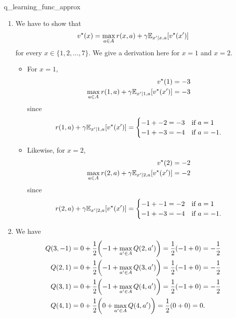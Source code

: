 \section*{}

\begin{solution}{q_learning_func_approx}
  \begin{enumerate}[beginpenalty=10000]
    \item We have to show that \begin{align*}
      \v*{x} = \max_{a \in \sA} r(x, a) + \gamma \E[x' \mid x, a]{\v*{x'}}
    \end{align*} for every $x \in \{1, 2, \dots, 7\}$.
    We give a derivation here for $x = 1$ and $x = 2$.
    \begin{itemize}
      \item For $x = 1$, \begin{align*}
        \v*{1} &= -3 \\
        \max_{a \in \sA} r(1, a) + \gamma \E[x' \mid 1, a]{\v*{x'}} &= -3
      \end{align*} since \begin{align*}
        r(1, a) + \gamma \E[x' \mid 1, a]{\v*{x'}} = \begin{cases}
          -1 + -2 = -3 & \text{if $a = 1$} \\
          -1 + -3 = -4 & \text{if $a = -1$}.
        \end{cases}
      \end{align*}
      \item Likewise, for $x = 2$, \begin{align*}
        \v*{2} &= -2 \\
        \max_{a \in \sA} r(2, a) + \gamma \E[x' \mid 2, a]{\v*{x'}} &= -2
      \end{align*} since \begin{align*}
        r(2, a) + \gamma \E[x' \mid 2, a]{\v*{x'}} = \begin{cases}
          -1 + -1 = -2 & \text{if $a = 1$} \\
          -1 + -3 = -4 & \text{if $a = -1$}.
        \end{cases}
      \end{align*}
    \end{itemize}

    \item We have \begin{align*}
      \Q{3}{-1} &= 0 + \frac{1}{2}\parentheses*{-1 + \max_{a' \in \sA} \Q{2}{a'}} = \frac{1}{2} (-1 + 0) = - \frac{1}{2} \\
      \Q{2}{1} &= 0 + \frac{1}{2}\parentheses*{-1 + \max_{a' \in \sA} \Q{3}{a'}} = \frac{1}{2} (-1 + 0) = - \frac{1}{2} \\
      \Q{3}{1} &= 0 + \frac{1}{2}\parentheses*{-1 + \max_{a' \in \sA} \Q{4}{a'}} = \frac{1}{2} (-1 + 0) = - \frac{1}{2} \\
      \Q{4}{1} &= 0 + \frac{1}{2}\parentheses*{0 + \max_{a' \in \sA} \Q{4}{a'}} = \frac{1}{2} (0 + 0) = 0.
    \end{align*}


\end{enumerate}
\end{solution}
